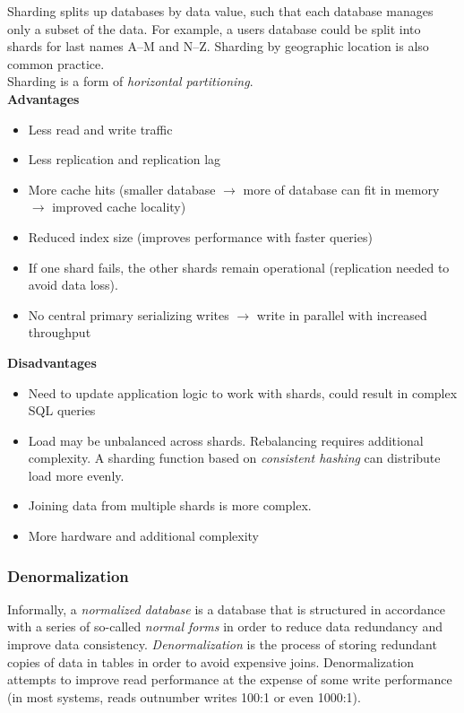 \documentclass[12pt, titlepage]{article}
\begin{document}
Sharding splits up databases by data value, such that each database manages only a subset of the data. For example, a users database could be split into shards for last names A--M and N--Z. Sharding by geographic location is also common practice. \\

Sharding is a form of \textit{horizontal partitioning}. \\

\textbf{Advantages}
\begin{itemize}
  \item Less read and write traffic
  \item Less replication and replication lag
  \item More cache hits (smaller database $\rightarrow$ more of database can fit in memory $\rightarrow$ improved cache locality)
  \item Reduced index size (improves performance with faster queries)
  \item If one shard fails, the other shards remain operational (replication needed to avoid data loss).
  \item No central primary serializing writes $\rightarrow$ write in parallel with increased throughput \\
\end{itemize}

\textbf{Disadvantages}
\begin{itemize}
  \item Need to update application logic to work with shards, could result in complex SQL queries
  \item Load may be unbalanced across shards. Rebalancing requires additional complexity. A sharding function based on \textit{consistent hashing} can distribute load more evenly.
  \item Joining data from multiple shards is more complex.
  \item More hardware and additional complexity
\end{itemize}

\subsubsection{Denormalization}

Informally, a \textit{normalized database} is a database that is structured in accordance with a series of so-called \textit{normal forms} in order to reduce data redundancy and improve data consistency. \textit{Denormalization} is the process of storing redundant copies of data in tables in order to avoid expensive joins. Denormalization attempts to improve read performance at the expense of some write performance (in most systems, reads outnumber writes 100:1 or even 1000:1). \\
\end{document}

